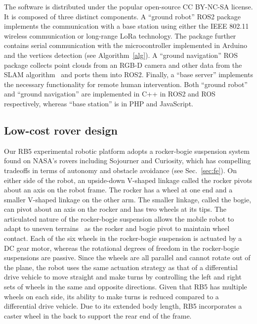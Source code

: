 \documentclass[letterpaper,10pt,conference,twoside]{IEEEtran}
\makeatletter
\theoremstyle{definition}
\newcommand\footnoteref[1]{\protected@xdef\@thefnmark{\ref{#1}}\@footnotemark}
\makeatother
\begin{document}
The %
software
is distributed under the popular open-source CC BY-NC-SA license\footnoteref{link}. %
It is composed of three distinct components. A ``ground robot'' ROS2 %
package implements the communication with a base station using either the IEEE 802.11 wireless communication or long-range LoRa technology. The package further %
contains serial communication with the microcontroller implemented in Arduino and the vertices detection (see Algorithm~\ref{alg}). A ``ground navigation'' ROS package collects point clouds from an RGB-D camera %
and other data from the SLAM algorithm~\cite{labbe2019rtab} and ports them into ROS2. Finally, a ``base server'' implements the necessary functionality for remote human intervention.
Both ``ground robot'' and ``ground navigation'' are implemented in C++ in ROS2 and ROS respectively, whereas ``base station'' is in PHP and JavaScript.

\subsection{Low-cost %
rover design}
\label{sec:md}
\noindent
Our RB5 experimental robotic platform %
adopts a rocker-bogie suspension system~\cite{bickler1989articulated} found on NASA's rovers including Sojourner and Curiosity, which has compelling tradeoffs in terms of autonomy and obstacle avoidance (see Sec.~\ref{sec:fe}). On either side of the robot, an upside-down V-shaped linkage called the rocker pivots about an axis on the robot frame. The rocker has a wheel at one end and a smaller V-shaped linkage on the other arm. The smaller linkage, called the bogie, can pivot about an axis on the rocker and has two wheels at its tips. The articulated nature of the rocker-bogie suspension allows the mobile robot to adapt to uneven terrains~\cite{%
faisal2021low} as the rocker and bogie pivot to maintain wheel contact. %
%
Each of the six wheels in the rocker-bogie suspension is actuated by a DC gear motor, whereas the rotational degrees of freedom in the rocker-bogie suspensions are passive. Since the wheels are all parallel and cannot rotate out of the plane, the robot uses the same actuation strategy as that of a differential drive vehicle to move straight and make turns by controlling the left and right sets of wheels in the same and opposite directions. Given that RB5 has multiple wheels on each side, its ability to make turns is reduced compared to a differential drive vehicle. Due to its extended body length, RB5 incorporates a caster wheel in the back to support the rear end of the frame.
\end{document}
